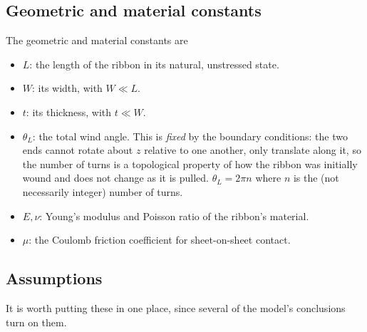 \documentclass[11pt]{article}
\begin{document}
\subsection{Geometric and material constants}\label{sec:constants}
The geometric and material constants are
\begin{itemize}
    \item $L$: the length of the ribbon in its natural, unstressed state.
    \item $W$: its width, with $W \ll L$.
    \item $t$: its thickness, with $t \ll W$.
    \item $\theta_L$: the total wind angle. This is \emph{fixed} by the boundary
      conditions: the two ends cannot rotate about $z$ relative to one another,
      only translate along it, so the number of turns is a topological property
      of how the ribbon was initially wound and does not change as it is pulled.
      $\theta_L = 2\pi n$ where $n$ is the (not necessarily integer) number of turns.
    \item $E,\nu$: Young's modulus and Poisson ratio of the ribbon's material.
    \item $\mu$: the Coulomb friction coefficient for sheet-on-sheet contact.
\end{itemize}

\subsection{Assumptions}\label{sec:assumptions}
It is worth putting these in one place, since several of the model's conclusions
turn on them.
\end{document}

